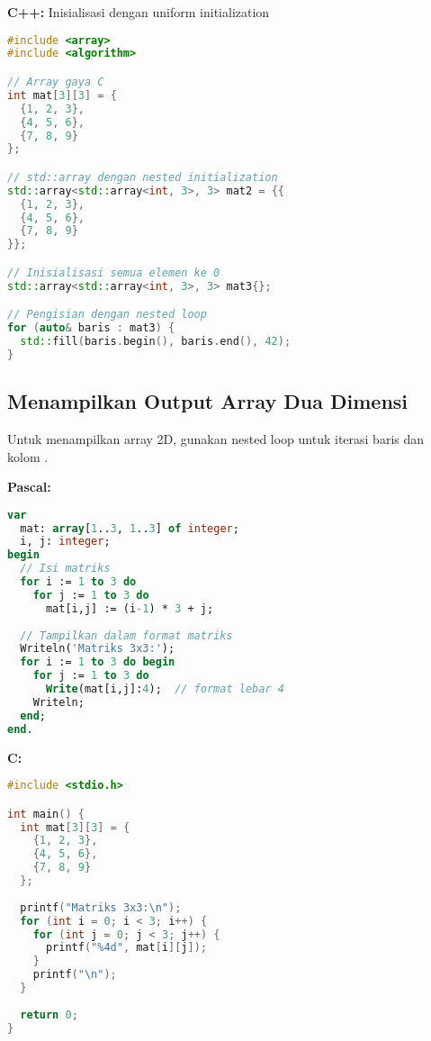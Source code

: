 \documentclass[../main.tex]{subfiles}
\begin{document}
\textbf{C++:} Inisialisasi dengan uniform initialization
\begin{lstlisting}[language=C++, caption={Inisialisasi array 2D di C++}]
#include <array>
#include <algorithm>

// Array gaya C
int mat[3][3] = {
  {1, 2, 3},
  {4, 5, 6},
  {7, 8, 9}
};

// std::array dengan nested initialization
std::array<std::array<int, 3>, 3> mat2 = {{
  {1, 2, 3},
  {4, 5, 6},
  {7, 8, 9}
}};

// Inisialisasi semua elemen ke 0
std::array<std::array<int, 3>, 3> mat3{};

// Pengisian dengan nested loop
for (auto& baris : mat3) {
  std::fill(baris.begin(), baris.end(), 42);
}
\end{lstlisting}

\subsection{Menampilkan Output Array Dua Dimensi}

Untuk menampilkan array 2D, gunakan nested loop untuk iterasi baris dan kolom \parencite{cplusplus-multidimensional,tutorialspoint-2d-arrays}.

\textbf{Pascal:}
\begin{lstlisting}[language=Pascal, caption={Menampilkan array 2D di Pascal}]
var
  mat: array[1..3, 1..3] of integer;
  i, j: integer;
begin
  // Isi matriks
  for i := 1 to 3 do
    for j := 1 to 3 do
      mat[i,j] := (i-1) * 3 + j;
  
  // Tampilkan dalam format matriks
  Writeln('Matriks 3x3:');
  for i := 1 to 3 do begin
    for j := 1 to 3 do
      Write(mat[i,j]:4);  // format lebar 4
    Writeln;
  end;
end.
\end{lstlisting}

\textbf{C:}
\begin{lstlisting}[language=C, caption={Menampilkan array 2D di C}]
#include <stdio.h>

int main() {
  int mat[3][3] = {
    {1, 2, 3},
    {4, 5, 6},
    {7, 8, 9}
  };
  
  printf("Matriks 3x3:\n");
  for (int i = 0; i < 3; i++) {
    for (int j = 0; j < 3; j++) {
      printf("%4d", mat[i][j]);
    }
    printf("\n");
  }
  
  return 0;
}
\end{lstlisting}
\end{document}
